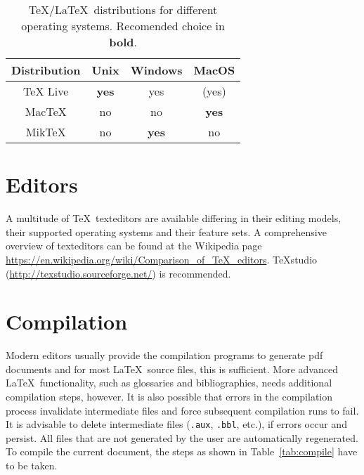 \begin{table}
  \centering
  \begin{tabular}{cccc}
    \toprule
    Distribution & Unix         & Windows      & MacOS        \\
    \midrule
    TeX Live     & \textbf{yes} & yes          & (yes)        \\
    MacTeX       & no           & no           & \textbf{yes} \\
    MikTeX       & no           & \textbf{yes} & no           \\
    \bottomrule
  \end{tabular}
  \caption{\TeX/\LaTeX\ distributions for different operating systems. Recomended choice in \textbf{bold}.}
  \label{tab:distrib} %
\end{table}

\section{Editors}

A multitude of \TeX\ \glspl{texteditor} are available differing in their editing models, their supported operating systems and their feature sets.
A comprehensive overview of \glspl{texteditor} can be found at the Wikipedia page  \url{https://en.wikipedia.org/wiki/Comparison_of_TeX_editors}.
TeXstudio (\url{http://texstudio.sourceforge.net/}) is recommended.

\section{Compilation}

Modern editors usually provide the compilation programs to generate \gls{pdf} documents and for most \LaTeX\ source files, this is sufficient.
More advanced \LaTeX\ functionality, such as glossaries and bibliographies, needs additional compilation steps, however.
It is also possible that errors in the compilation process invalidate intermediate files and force subsequent compilation runs to fail.
It is advisable to delete intermediate files (\verb|.aux|, \verb|.bbl|, etc.), if errors occur and persist.
All files that are not generated by the user are automatically regenerated.
To compile the current document, the steps as shown in Table~\ref{tab:compile} have to be taken.


